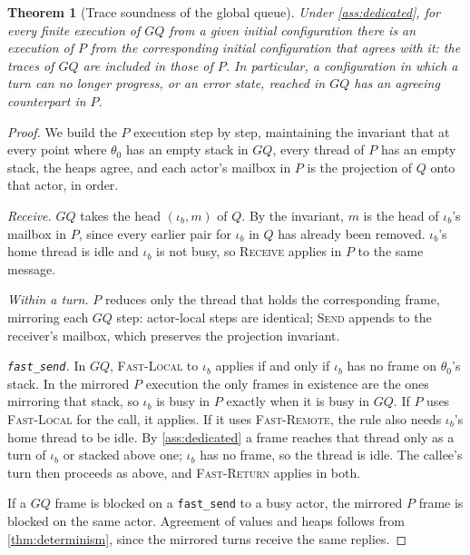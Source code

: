 \documentclass[11pt]{article}
\newtheorem{theorem}{Theorem}
\theoremstyle{definition}
\theoremstyle{remark}
\newcommand{\fs}{\texttt{fast\_send}}
\begin{document}
\begin{theorem}[Trace soundness of the global queue]
\label{thm:gqsound}
Under \cref{ass:dedicated}, for every finite execution of $\mathit{GQ}$ from a given
initial configuration there is an execution of $\mathit{P}$ from the corresponding initial
configuration that agrees with it: the traces of $\mathit{GQ}$ are included in those of
$\mathit{P}$. In particular, a configuration in which a turn can no longer progress, or
an error state, reached in $\mathit{GQ}$ has an agreeing counterpart in $\mathit{P}$.
\end{theorem}
\begin{proof}
We build the $\mathit{P}$ execution step by step, maintaining the invariant that at every
point where $\theta_0$ has an empty stack in $\mathit{GQ}$, every thread of $\mathit{P}$
has an empty stack, the heaps agree, and each actor's mailbox in $\mathit{P}$ is the
projection of $Q$ onto that actor, in order.

\emph{Receive.} $\mathit{GQ}$ takes the head $(\iota_b, m)$ of $Q$. By the invariant,
$m$ is the head of $\iota_b$'s mailbox in $\mathit{P}$, since every earlier pair for
$\iota_b$ in $Q$ has already been removed. $\iota_b$'s home thread is idle and $\iota_b$
is not busy, so \textsc{Receive} applies in $\mathit{P}$ to the same message.

\emph{Within a turn.} $\mathit{P}$ reduces only the thread that holds the corresponding
frame, mirroring each $\mathit{GQ}$ step: actor-local steps are identical; \textsc{Send}
appends to the receiver's mailbox, which preserves the projection invariant.

\emph{\fs{}.} In $\mathit{GQ}$, \textsc{Fast-Local} to $\iota_b$ applies if and only if
$\iota_b$ has no frame on $\theta_0$'s stack. In the mirrored $\mathit{P}$ execution the
only frames in existence are the ones mirroring that stack, so $\iota_b$ is busy in
$\mathit{P}$ exactly when it is busy in $\mathit{GQ}$. If $\mathit{P}$ uses
\textsc{Fast-Local} for the call, it applies. If it uses \textsc{Fast-Remote}, the rule
also needs $\iota_b$'s home thread to be idle. By \cref{ass:dedicated} a frame reaches
that thread only as a turn of $\iota_b$ or stacked above one; $\iota_b$ has no frame, so
the thread is idle. The callee's turn then
proceeds as above, and \textsc{Fast-Return} applies in both.

If a $\mathit{GQ}$ frame is blocked on a \fs{} to a busy actor, the mirrored
$\mathit{P}$ frame is blocked on the same actor. Agreement of values and heaps follows from
\cref{thm:determinism}, since the mirrored turns receive the same replies.
\end{proof}
\end{document}
